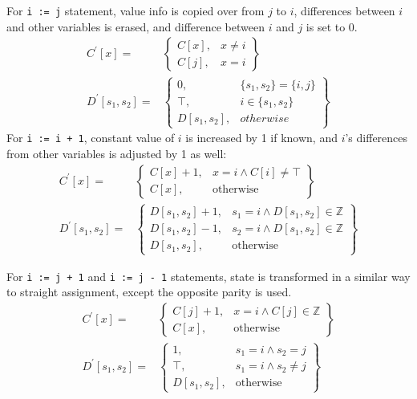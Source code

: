 For \texttt{i := j} statement, value info is copied over from $j$ to $i$, differences between $i$ and other variables is erased, and difference between $i$ and $j$ is set to 0.
\begin{align*}
C^\prime[x] = & \left.
	\begin{cases}
		C[x], & x\ne i \\
		C[j], & x = i
	\end{cases}
\right\}\\
D^\prime[s_1,s_2] = & \left.
	\begin{cases}
		0, & \{s_1,s_2\} = \{i,j\} \\
		\top, & i \in \{s_1, s_2\} \\
		D[s_1,s_2], & otherwise
	\end{cases}
\right\}
\end{align*}
For \texttt{i := i + 1}, constant value of $i$ is increased by 1 if known, and $i$'s differences from other variables is adjusted by 1 as well:
\begin{align*}
C^\prime[x] = & \left.
	\begin{cases}
		C[x] + 1, & x = i \wedge C[i] \ne \top \\
		C[x], & \text{otherwise}
	\end{cases}
\right\}\\
D^\prime[s_1,s_2] = & \left.
	\begin{cases}
		D[s_1,s_2] + 1, & s_1 = i \wedge D[s_1,s_2] \in \mathbb{Z}\\
		D[s_1,s_2] - 1, & s_2 = i \wedge D[s_1,s_2] \in \mathbb{Z}\\
		D[s_1,s_2], & \text{otherwise}
	\end{cases}
\right\}
\end{align*}

For \texttt{i := j + 1} and \texttt{i := j - 1} statements, state is transformed in a similar way to straight assignment, except the opposite parity is used.
\begin{align*}
C^\prime[x] = & \left.
	\begin{cases}
		C[j] + 1, & x = i \wedge C[j] \in \mathbb{Z} \\
		C[x], & \text{otherwise}
	\end{cases}
\right\}\\
D^\prime[s_1,s_2] = & \left.
	\begin{cases}
		1, & s_1 = i \wedge s_2 = j\\
		\top, & s_1 = i \wedge s_2 \ne j\\
		D[s_1,s_2], & \text{otherwise}	
	\end{cases}
\right\}\\
\end{align*}

